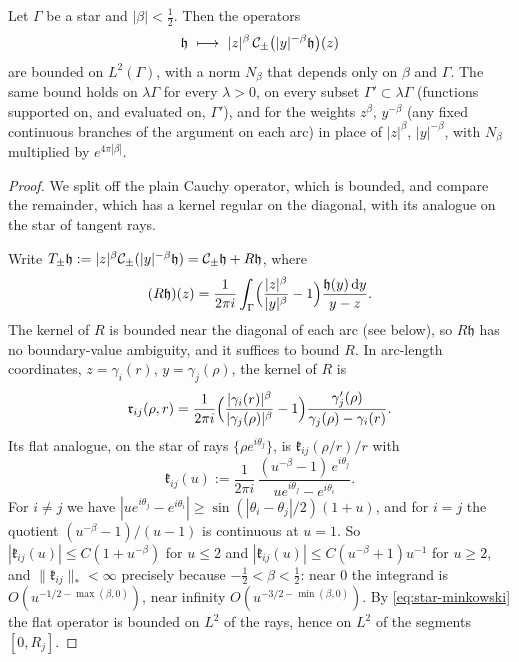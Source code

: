 \begin{lemma}\label{lem:star-power}
Let $\Gamma$ be a star and $|\beta|<\frac12$. Then the operators
\[
  \mathfrak h\ \longmapsto\ |z|^{\beta}\,\Cauchy_\pm\bigl(|y|^{-\beta}\mathfrak h\bigr)(z)
\]
are bounded on $L^2(\Gamma)$, with a norm $N_\beta$ that depends only on $\beta$ and $\Gamma$. The same bound holds on
$\lambda\Gamma$ for every $\lambda>0$, on every subset $\Gamma'\subset\lambda\Gamma$ (functions supported on, and
evaluated on, $\Gamma'$), and for the weights $z^{\beta}$, $y^{-\beta}$ (any fixed continuous branches of the argument
on each arc) in place of $|z|^\beta$, $|y|^{-\beta}$, with $N_\beta$ multiplied by $e^{4\pi|\beta|}$.
\end{lemma}

\begin{proof}
We split off the plain Cauchy operator, which is bounded, and compare the remainder, which has a kernel
regular on the diagonal, with its analogue on the star of tangent rays.

Write $T_\pm\mathfrak h:=|z|^\beta\mathcal{C}_\pm(|y|^{-\beta}\mathfrak h)=\mathcal{C}_\pm\mathfrak h+R\mathfrak h$, where
\[
  (R\mathfrak h)(z)=\frac1{2\pi i}\int_\Gamma\Bigl(\frac{|z|^\beta}{|y|^\beta}-1\Bigr)\frac{\mathfrak h(y)\,\mathrm{d} y}{y-z}.
\]
The kernel of $R$ is bounded near the diagonal of each arc (see below), so $R\mathfrak h$ has no boundary-value
ambiguity, and it suffices to bound $R$. In arc-length coordinates, $z=\gamma_i(r)$, $y=\gamma_j(\rho)$, the kernel of
$R$ is
\[
  \mathfrak r_{ij}(\rho,r)=\frac1{2\pi i}\Bigl(\frac{|\gamma_i(r)|^\beta}{|\gamma_j(\rho)|^\beta}-1\Bigr)
  \frac{\gamma_j'(\rho)}{\gamma_j(\rho)-\gamma_i(r)} .
\]
Its flat analogue, on the star of rays $\{\rho e^{i\theta_j}\}$, is $\mathfrak k_{ij}(\rho/r)/r$ with
\[
  \mathfrak k_{ij}(u):=\frac1{2\pi i}\,\frac{(u^{-\beta}-1)\,e^{i\theta_j}}{ue^{i\theta_j}-e^{i\theta_i}} .
\]
For $i\ne j$ we have $|ue^{i\theta_j}-e^{i\theta_i}|\ge\sin(|\theta_i-\theta_j|/2)(1+u)$, and for $i=j$ the quotient
$(u^{-\beta}-1)/(u-1)$ is continuous at $u=1$. So $|\mathfrak k_{ij}(u)|\le C(1+u^{-\beta})$ for $u\le2$ and
$|\mathfrak k_{ij}(u)|\le C(u^{-\beta}+1)u^{-1}$ for $u\ge2$, and $\|\mathfrak k_{ij}\|_*<\infty$ precisely because
$-\frac12<\beta<\frac12$: near $0$ the integrand is $O(u^{-1/2-\max(\beta,0)})$, near infinity $O(u^{-3/2-\min(\beta,0)})$.
By \eqref{eq:star-minkowski} the flat operator is bounded on $L^2$ of the rays, hence on $L^2$ of the segments $[0,R_j]$.


\end{proof}
